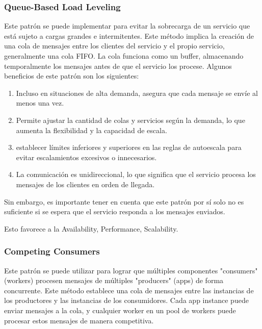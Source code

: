\documentclass{article}
\begin{document}
		\subsubsection{Queue-Based Load Leveling}
		Este patrón se puede implementar para evitar la sobrecarga de un servicio que está sujeto a cargas grandes e intermitentes. Este método implica la creación de una cola de mensajes entre los clientes del servicio y el propio servicio, generalmente una cola FIFO. La cola funciona como un buffer, almacenando temporalmente los mensajes antes de que el servicio los procese.
		Algunos beneficios de este patrón son los siguientes:
			\begin{enumerate}
				\item Incluso en situaciones de alta demanda, asegura que cada mensaje se envíe al menos una vez. 
				\item Permite ajustar la cantidad de colas y servicios según la demanda, lo que aumenta la flexibilidad y la capacidad de escala.
				\item establecer límites inferiores y superiores en las reglas de autoescala para evitar escalamientos excesivos o innecesarios.
				\item La comunicación es unidireccional, lo que significa que el servicio procesa los mensajes de los clientes en orden de llegada.
			\end{enumerate}

		Sin embargo, es importante tener en cuenta que este patrón por sí solo no es suficiente si se espera que el servicio responda a los mensajes enviados.
		
		Esto favorece a la Availability, Performance, Scalability.
		
		\subsubsection{Competing Consumers}
		Este patrón se puede utilizar para lograr que múltiples componentes "consumers" (workers) procesen mensajes de múltiples  "producers" (apps) de forma concurrente. Este método establece una cola de mensajes entre las instancias de los productores y las instancias de los consumidores. Cada app instance puede enviar mensajes a la cola, y cualquier worker en un pool de workers puede procesar estos mensajes de manera competitiva.
		
\end{document}
